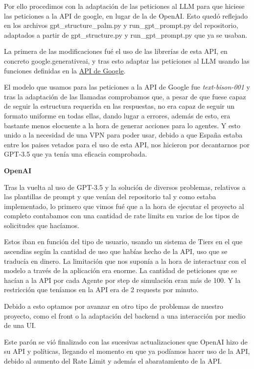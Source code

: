 Por ello procedimos con la adaptación de las peticiones al LLM para que hiciese las peticiones a la API de google, en lugar de la de OpenAI. Esto quedó reflejado en los archivos gpt\_structure\_palm.py y run\_gpt\_prompt.py del repositorio, adaptados a partir de gpt\_structure.py y run\_gpt\_prompt.py que ya se usaban.

La primera de las modificaciones fué el uso de las librerías de esta API, en concreto google.generativeai, y tras esto adaptar las peticiones al LLM usando las funciones definidas en la \href{https://ai.google.dev/palm_docs}{API de Google}.

El modelo que usamos para las peticiones a la API de Google fue \textit{text-bison-001} y tras la adaptación de las llamadas comprobamos que, a pesar de que fuese capaz de seguir la estructura requerida en las respuestas, no era capaz de seguir un formato uniforme en todas ellas, dando lugar a errores, además de esto, era bastante menos elocuente a la hora de generar acciones para lo agentes. Y esto unido a la necesidad de una VPN para poder usar, debido a que España estaba entre los paises vetados para el uso de esta API, nos hicieron por decantarnos por GPT-3.5 que ya tenía una eficacia comprobada.

\textbf{OpenAI}

Tras la vuelta al uso de GPT-3.5 y la solución de diversos problemas, relativos a las plantillas de prompt y que venían del repositorio tal y como estaba implementado, lo primero que vimos fué que a la hora de ejecutar el proyecto al completo contabamos con una cantidad de rate limits en varios de los tipos de solicitudes que hacíamos.

Estos iban en función del tipo de usuario, usando un sistema de Tiers en el que ascendias según la cantidad de uso que habías hecho de la API, uso que se traducía en dinero. La limitación que nos suponía a la hora de interactuar con el modelo a través de la aplicación era enorme. La cantidad de peticiones que se hacían a la API por cada Agente por step de simulación eran más de 100. Y la restricción que teníamos en la API era de 2 requests por minuto.

Debido a esto optamos por avanzar en otro tipo de problemas de nuestro proyecto, como el front o la adaptación del backend a una interacción por medio de una UI.

Este parón se vió finalizado con las sucesivas actualizaciones que OpenAI hizo de su API y políticas, llegando el momento en que ya podíamos hacer uso de la API, debido al aumento del Rate Limit y además el abaratamiento de la API.


